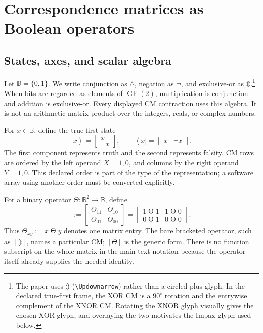 \documentclass[11pt]{article}
\newcommand{\Bool}{\mathbb{B}}
\newcommand{\GFtwo}{\operatorname{GF}(2)}
\newcommand{\XOR}{\mathbin{\Updownarrow}}
\newcommand{\CM}[1]{[#1]}
\newcommand{\stateket}[1]{\left|#1\right\rangle}
\newcommand{\statebra}[1]{\left\langle#1\right|}
\begin{document}
\section{Correspondence matrices as Boolean operators}
\label{sec:cm-operators}

\subsection{States, axes, and scalar algebra}

Let $\Bool=\{0,1\}$. We write conjunction as $\wedge$, negation as $\neg$,
and exclusive-or as $\XOR$.\footnote{The paper uses $\XOR$
(\texttt{\textbackslash Updownarrow}) rather than a circled-plus glyph. In
the declared true-first frame, the XOR CM is a $90^\circ$ rotation and the
entrywise complement of the XNOR CM. Rotating the XNOR glyph visually gives
the chosen XOR glyph, and overlaying the two motivates the Impax glyph used
below.} When bits are regarded as elements of $\GFtwo$, multiplication is
conjunction and addition is exclusive-or. Every displayed CM contraction uses
this algebra. It is not an arithmetic matrix product over the integers, reals,
or complex numbers.

For $x\in\Bool$, define the true-first state
\begin{equation}
  \stateket{x}=\begin{bmatrix}x\\ \neg x\end{bmatrix},
  \qquad
  \statebra{x}=\begin{bmatrix}x&\neg x\end{bmatrix}.
  \label{eq:true-first-state}
\end{equation}
The first component represents truth and the second represents falsity. CM
rows are ordered by the left operand $X=1,0$, and columns by the right operand
$Y=1,0$. This declared order is part of the type of the representation; a
software array using another order must be converted explicitly.

For a binary operator $\Theta:\Bool^2\rightarrow\Bool$, define
\begin{equation}
  \CM{\Theta}
  :=
  \begin{bmatrix}
    \Theta_{11} & \Theta_{10}\\
    \Theta_{01} & \Theta_{00}
  \end{bmatrix}
  =
  \begin{bmatrix}
    1\mathbin{\Theta}1 & 1\mathbin{\Theta}0\\
    0\mathbin{\Theta}1 & 0\mathbin{\Theta}0
  \end{bmatrix}.
  \label{eq:cm-definition}
\end{equation}
Thus $\Theta_{xy}:=x\mathbin{\Theta}y$ denotes one matrix entry. The bare
bracketed operator, such as $\CM{\XOR}$, names a particular CM; $\CM{\Theta}$
is the generic form. There is no function subscript on the whole matrix in the
main-text notation because the operator itself already supplies the needed
identity.
\end{document}
